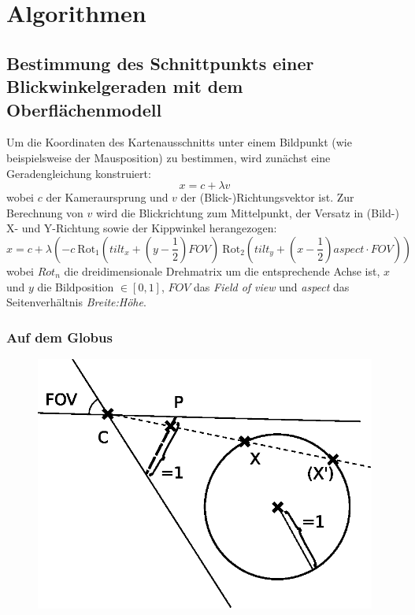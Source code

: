 \documentclass[10pt]{scrreprt}
\begin{document}


\chapter{Algorithmen}

\section{Bestimmung des Schnittpunkts einer Blickwinkelgeraden mit dem Oberflächenmodell}
Um die Koordinaten des Kartenausschnitts unter einem Bildpunkt (wie beispielsweise der Mausposition) zu bestimmen, wird zunächst eine Geradengleichung konstruiert:
\[x = c+\lambda v\]
wobei $c$ der Kameraursprung und $v$ der (Blick-)Richtungsvektor ist. Zur Berechnung von $v$ wird die Blickrichtung zum Mittelpunkt, der Versatz in (Bild-) X- und Y-Richtung sowie der Kippwinkel herangezogen:
\[x = c+\lambda\left(-c\ \mathrm{Rot}_1\left(tilt_x+\left(y-\frac{1}{2}\right)FOV\right)\ \mathrm{Rot}_2\left(tilt_y+\left(x-\frac{1}{2}\right)aspect\cdot FOV\right)\right)\]
wobei $Rot_n$ die dreidimensionale Drehmatrix um die entsprechende Achse ist, $x$ und $y$ die Bildposition $\in [0, 1]$, $FOV$ das \textit{Field of view} und \textit{aspect} das Seitenverhältnis \textit{Breite:Höhe}.

\subsection{Auf dem Globus}

\begin{figure}
\includegraphics[scale=0.75]{algo/SchnittKugel.eps}
\end{figure}
\end{document}
